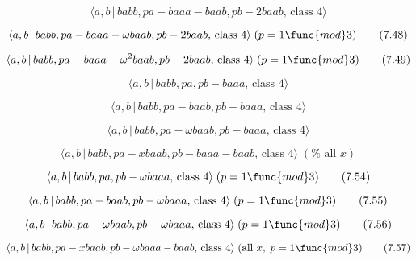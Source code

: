 \documentclass[10pt]{article}
\begin{document}
\begin{equation}
\langle a,b\,|\,babb,pa-baaa-baab,pb-2baab,\,\text{class }4\rangle 
\tag{7.47}
\end{equation}

\begin{equation}
\langle a,b\,|\,babb,pa-baaa-\omega baab,pb-2baab,\,\text{class }4\rangle
\;(p=1\func{mod}3)  \tag{7.48}
\end{equation}

\begin{equation}
\langle a,b\,|\,babb,pa-baaa-\omega ^{2}baab,pb-2baab,\,\text{class }%
4\rangle \;(p=1\func{mod}3)  \tag{7.49}
\end{equation}

\begin{equation}
\langle a,b\,|\,babb,pa,pb-baaa,\,\text{class }4\rangle  \tag{7.50}
\end{equation}

\begin{equation}
\langle a,b\,|\,babb,pa-baab,pb-baaa,\,\text{class }4\rangle  \tag{7.51}
\end{equation}

\begin{equation}
\langle a,b\,|\,babb,pa-\omega baab,pb-baaa,\,\text{class }4\rangle 
\tag{7.52}
\end{equation}

\begin{equation}
\langle a,b\,|\,babb,pa-xbaab,pb-baaa-baab,\,\text{class }4\rangle \;(\text{%
all }x)  \tag{7.53}
\end{equation}

\begin{equation}
\langle a,b\,|\,babb,pa,pb-\omega baaa,\,\text{class }4\rangle \;(p=1\func{%
mod}3)  \tag{7.54}
\end{equation}

\begin{equation}
\langle a,b\,|\,babb,pa-baab,pb-\omega baaa,\,\text{class }4\rangle \;(p=1%
\func{mod}3)  \tag{7.55}
\end{equation}

\begin{equation}
\langle a,b\,|\,babb,pa-\omega baab,pb-\omega baaa,\,\text{class }4\rangle
\;(p=1\func{mod}3)  \tag{7.56}
\end{equation}

\begin{equation}
\langle a,b\,|\,babb,pa-xbaab,pb-\omega baaa-baab,\,\text{class }4\rangle \;(%
\text{all }x,\;p=1\func{mod}3)  \tag{7.57}
\end{equation}
\end{document}
